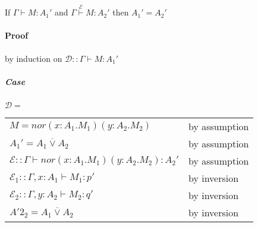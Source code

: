 \documentclass[12 pt]{article}
\begin{document}
       \begin{prooftree}
       \end{prooftree}
       \begin{prooftree}
       \end{prooftree}
       \begin{prooftree}
       \end{prooftree}
       If $\Gamma \vdash M : A_1'$ and $\Gamma \stackrel{\mathcal{E}}{\vdash} M:A_2 '$ then
       $A_1' = A_2'$
       \paragraph{Proof} by induction on $\mathcal{D} :: \Gamma
       \vdash M : A_1'$
       \subparagraph{Case} $\mathcal{D} =$
       \noLine{}
       \noLine{}
       \DP
       \\
       \begin{tabular}{l l}
         $M = nor (x:A_1.M_1)(y:A_2.M_2)$& by assumption
         \\ $A_1' = A_1 \overline{\lor} A_2$ & by assumption
         \\ $\mathcal{E} :: \Gamma \vdash nor(x:A_1.M_1)(y:A_2.M_2) : A_2'$ & by assumption
         \\ $\mathcal{E}_1 :: \Gamma, x:A_1 \vdash M_1 : p'$ & by inversion
         \\ $\mathcal{E}_2 :: \Gamma, y:A_2 \vdash M_2 : q'$ & by inversion
         \\ $A'2_2 = A_1 \overline{\lor} A_2$ & by inversion
       \end{tabular}

      
\end{document}
